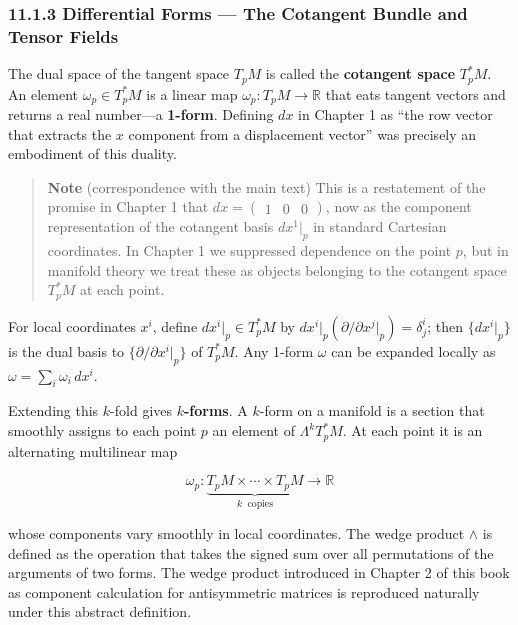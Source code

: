 \documentclass[a4paper,12pt,openany]{book}
\begin{document}
\hypertarget{differential-forms-the-cotangent-bundle-and-tensor-fields}{%
\subsubsection{11.1.3 Differential Forms — The Cotangent Bundle and
Tensor
Fields}\label{differential-forms-the-cotangent-bundle-and-tensor-fields}}

The dual space of the tangent space \(T_p M\) is called the
\textbf{cotangent space} \(T_p^* M\). An element
\(\omega_p \in T_p^* M\) is a linear map
\(\omega_p: T_p M \to \mathbb{R}\) that eats tangent vectors and returns
a real number—a \textbf{1-form}. Defining \(dx\) in Chapter 1 as ``the
row vector that extracts the \(x\) component from a displacement
vector'' was precisely an embodiment of this duality.

\begin{quote}
\textbf{Note} (correspondence with the main text) This is a restatement
of the promise in Chapter 1 that
\(dx = \begin{pmatrix}1&0&0\end{pmatrix}\), now as the component
representation of the cotangent basis \(dx^1|_p\) in standard Cartesian
coordinates. In Chapter 1 we suppressed dependence on the point \(p\),
but in manifold theory we treat these as objects belonging to the
cotangent space \(T_p^* M\) at each point.
\end{quote}

For local coordinates \(x^i\), define \(dx^i|_p \in T_p^* M\) by
\(dx^i|_p(\partial/\partial x^j|_p) = \delta^i_j\); then \(\{dx^i|_p\}\)
is the dual basis to \(\{\partial/\partial x^i|_p\}\) of \(T_p^* M\).
Any 1-form \(\omega\) can be expanded locally as
\(\omega = \sum_i \omega_i\,dx^i\).

Extending this \(k\)-fold gives \textbf{\(k\)-forms}. A \(k\)-form on a
manifold is a section that smoothly assigns to each point \(p\) an
element of \(\Lambda^k T_p^* M\). At each point it is an alternating
multilinear map

\[\omega_p: \underbrace{T_p M \times \cdots \times T_p M}_{k\ \text{ copies}} \to \mathbb{R}\]

whose components vary smoothly in local coordinates. The wedge product
\(\wedge\) is defined as the operation that takes the signed sum over
all permutations of the arguments of two forms. The wedge product
introduced in Chapter 2 of this book as component calculation for
antisymmetric matrices is reproduced naturally under this abstract
definition.
\end{document}
